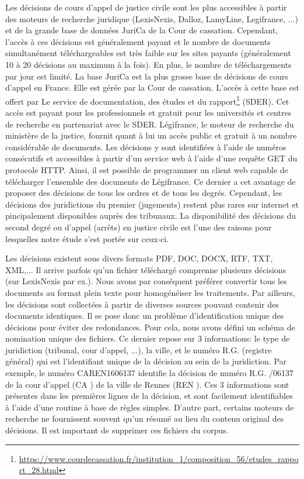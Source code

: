 Les décisions de cours d'appel de justice civile sont les plus accessibles à partir des moteurs de recherche juridique (LexisNexis, 
Dalloz, LamyLine, Legifrance, ...) et de la grande base de données JuriCa de la Cour de cassation. Cependant, l'accès à ces décisions est généralement payant et le nombre de documents simultanément téléchargeables est très faible sur les sites payants (généralement 10 à 20 décisions au maximum à la fois). En plus, le nombre de téléchargements par jour est limité. La base JuriCa est la plus grosse base de décisions de cours d'appel en France. Elle est gérée par la Cour de cassation. L'accès à cette base est offert par Le service de documentation, des études et du rapport\footnote{\url{https://www.courdecassation.fr/institution_1/composition_56/etudes_rapport_28.html}} (SDER). Cet accès est payant pour les professionnels et gratuit pour les universités et centres de recherche en partenariat avec le SDER. Légifrance, le moteur de recherche du ministère de la justice, fournit quant à lui un accès public et gratuit à un nombre considérable de documents. Les décisions y sont identifiées à l'aide de numéros consécutifs et accessibles à partir d'un service web à l'aide d'une requête GET du protocole HTTP. Ainsi, il est possible de programmer un client web capable de télécharger l'ensemble des documents de Légifrance. Ce dernier a cet avantage de proposer des décisions de tous les ordres et de tous les degrés. Cependant, les décisions des juridictions du premier (jugements) restent plus rares sur internet et pincipalement disponibles auprès des tribunaux.  La disponibilité des décisions du second degré ou d'appel (arrêts) en justice civile est l'une des raisons pour lesquelles notre étude s'est portée sur ceux-ci.

Les décisions existent sous divers formats PDF, DOC, DOCX, RTF, TXT, XML,... Il arrive parfois qu'un fichier téléchargé comprenne plusieurs décisions (sur LexisNexis par ex.). Nous avons par conséquent préférer convertir tous les documents au format plein texte pour homogénéiser les traitements. Par ailleurs, les décisions sont collectées à partir de diverses sources pouvant contenir des documents identiques. Il se pose donc un problème d'identification unique des décisions pour éviter des redondances. Pour cela, nous avons défini un schéma de nomination unique des fichiers. Ce dernier repose sur 3 informations: le type de juridiction (tribunal, cour d'appel, ...), la ville, et le numéro R.G. (registre général) qui est l'identifiant unique de la décision au sein de la juridiction. Par exemple, le numéro \og CAREN1606137 \fg{} identifie la décision de numéro R.G. /06137 \fg{} de la cour d'appel (\og CA \fg{}) de la ville de Rennes (\og REN \fg{}). Ces 3 informations sont présentes dans les premières lignes de la décision, et sont facilement identifiables à l'aide d'une routine à base de règles simples. D'autre part, certains moteurs de recherche ne fournissent souvent qu'un résumé au lieu du contenu original des décisions. Il est important de supprimer ces fichiers du corpus.

